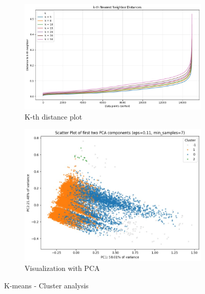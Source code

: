 \begin{figure}[H]
    \centering
    \begin{subfigure}[b]{0.48\textwidth}
        \centering
        \includegraphics[width=\textwidth]{plots/2_dbscan_eps.jpg}
        \caption{K-th distance plot}
        \label{fig:dbscan_kth}
    \end{subfigure}
    \begin{subfigure}[b]{0.48\textwidth}
        \centering
        \includegraphics[width=\textwidth]{plots/2_dbscan_scatterplot.jpg}
        \caption{Visualization with PCA}
        \label{fig:kmeans_visualization}
    \end{subfigure}
    \caption{K-means - Cluster analysis}
    \label{fig:subplots_kmeans}
\end{figure}

